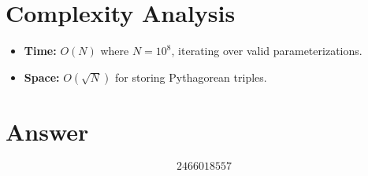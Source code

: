 \documentclass[12pt]{article}
\begin{document}
\section{Complexity Analysis}

\begin{itemize}
    \item \textbf{Time:} $O(N)$ where $N = 10^8$, iterating over valid parameterizations.
    \item \textbf{Space:} $O(\sqrt{N})$ for storing Pythagorean triples.
\end{itemize}

\section{Answer}

\[
\boxed{2466018557}
\]
\end{document}
